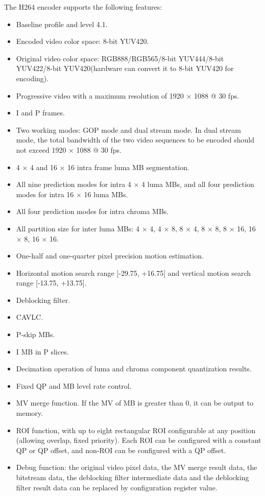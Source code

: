 \documentclass[main\_\_EN.tex]{subfiles}
\begin{document}
The H264 encoder supports the following features:
\begin{itemize}
    \item Baseline profile and level 4.1.
    \item Encoded video color space: 8-bit YUV420.
    \item Original video color space: RGB888/RGB565/8-bit YUV444/8-bit YUV422/8-bit YUV420(hardware can convert it to 8-bit YUV420 for encoding).
    \item Progressive video with a maximum resolution of 1920 × 1088 @ 30 fps.
    \item I and P frames.
    \item Two working modes: GOP mode and dual stream mode. In dual stream mode, the total bandwidth of the two video sequences to be encoded should not exceed 1920 × 1088 @ 30 fps.
    \item 4 × 4 and 16 × 16 intra frame luma MB segmentation.
    \item All nine prediction modes for intra 4 × 4 luma MBs, and all four prediction modes for intra 16 × 16 luma MBs.
    \item All four prediction modes for intra chroma MBs.
    \item All partition size for inter luma MBs: 4 × 4, 4 × 8, 8 × 4, 8 × 8, 8 × 16, 16 × 8, 16 × 16.
    \item One-half and one-quarter pixel precision motion estimation.
    \item Horizontal motion search range [-29.75, +16.75] and vertical motion search range [-13.75, +13.75].
    \item Deblocking filter.
    \item CAVLC.
    \item P-skip MBs.
    \item I MB in P slices.
    \item Decimation operation of luma and chroma component quantization results.
    \item Fixed QP and MB level rate control.
    \item MV merge function. If the MV of MB is greater than 0, it can be output to memory.
    \item ROI function, with up to eight rectangular ROI configurable at any position (allowing overlap, fixed priority). Each ROI can be configured with a constant QP or QP offset, and non-ROI can be configured with a QP offset.
    \item Debug function: the original video pixel data, the MV merge result data, the bitstream data, the deblocking filter intermediate data and the deblocking filter result data can be replaced by configuration register value.
\end{itemize}
\end{document}

